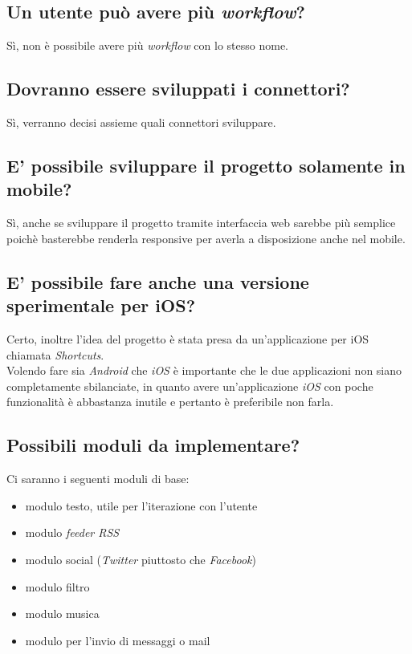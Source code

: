 \documentclass[a4paper,12pt]{article}
\begin{document}
	\subsection{Un utente può avere più \textit{workflow}?}
	Sì, non è possibile avere più \textit{workflow} con lo stesso nome.
	
	\subsection{Dovranno essere sviluppati i connettori?}
	Sì, verranno decisi assieme quali connettori sviluppare.
	
	\subsection{E' possibile sviluppare il progetto solamente in mobile?}
	Sì, anche se sviluppare il progetto  tramite interfaccia web sarebbe  più semplice poichè basterebbe renderla responsive per averla a disposizione anche nel mobile.
	
	\subsection{E' possibile fare anche una versione sperimentale per iOS?}
	Certo, inoltre l'idea del progetto è stata presa da un'applicazione per iOS chiamata \textit{Shortcuts}. \\
	Volendo fare sia \textit{Android} che \textit{iOS} è importante che le due applicazioni non siano completamente sbilanciate, in quanto avere un'applicazione \textit{iOS} con poche funzionalità è abbastanza inutile e pertanto è preferibile non farla.
	
	\subsection{Possibili moduli da implementare?}
	Ci saranno i seguenti moduli di base:
	\begin{itemize}
		\item modulo testo, utile per l'iterazione con l'utente 
		\item modulo \textit{feeder RSS} 
		\item modulo social (\textit{Twitter} piuttosto che \textit{Facebook})
		\item modulo filtro
		\item modulo musica
		\item modulo per l'invio di messaggi o mail
	\end{itemize}
\end{document}
